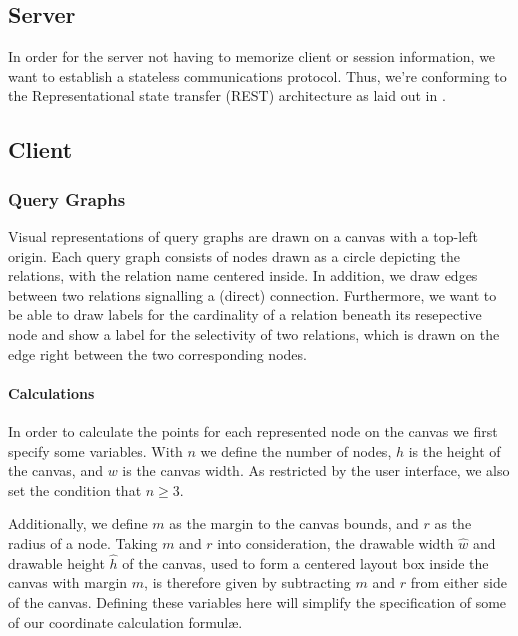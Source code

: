 \subsection{Server}
\label{sub:concepts-server}

In order for the server not having to memorize client or session information, we want to establish a stateless communications protocol.
Thus, we're conforming to the Representational state transfer (REST) architecture as laid out in \cite{fielding2000architectural}.

\subsection{Client}

\subsubsection{Query Graphs}
\label{subsub:query-graphs}

Visual representations of query graphs are drawn on a canvas with a top-left origin. Each query graph consists of nodes drawn as a circle depicting the relations, with the relation name centered inside. In addition, we draw edges  between two relations signalling a (direct) connection. Furthermore, we want to be able to draw labels for the cardinality of a relation beneath its resepective node and show a label for the selectivity of two relations, which is drawn on the edge right between the two corresponding nodes.

\paragraph{Calculations}
In order to calculate the points for each represented node on the canvas we first specify some variables.
With $n$ we define the number of nodes, $h$ is the height of the canvas, and $w$ is the canvas width. 
As restricted by the user interface, we also set the condition that $n \geq 3$.

Additionally, we define $m$ as the margin to the canvas bounds, and $r$ as the radius of a node.
Taking $m$ and $r$ into consideration, the drawable width $\hat{w}$ and drawable height $\hat{h}$ of the canvas, used to form a centered layout box inside the canvas with margin $m$, is therefore given by subtracting $m$ and $r$ from either side of the canvas. Defining these variables here will simplify the specification of some of our coordinate calculation formul\ae.

